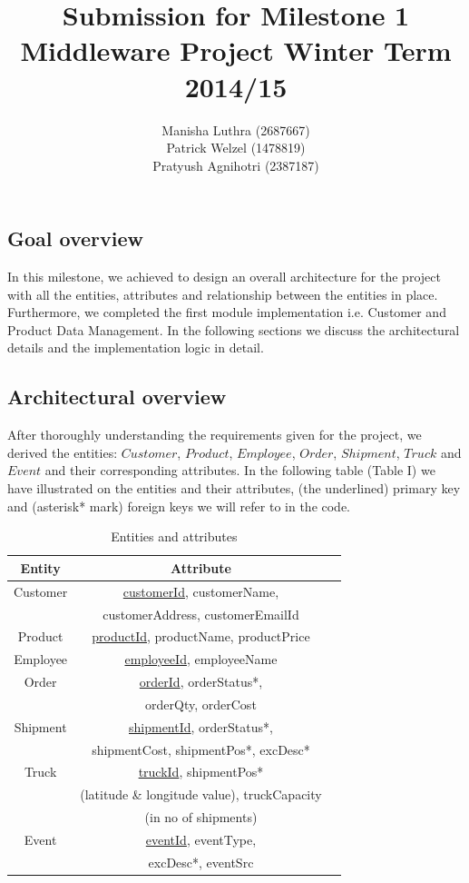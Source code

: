 \documentclass[twoside,colorbacktitle,accentcolor=tud1b]{tudexercise}
\title{Submission for Milestone 1
\linebreak[1] Middleware Project
\linebreak[1] Winter Term 2014/15}
\subtitle{Manisha Luthra (2687667) \\
Patrick Welzel (1478819)\\
Pratyush Agnihotri (2387187)}
\begin{document}
  \begin{examheader}
  \end{examheader}
\setcounter{section}{1}
\maketitle
  \subsection{Goal overview}
  In this milestone, we achieved to design an overall architecture for the project with all the entities, attributes and relationship between the entities in place. Furthermore, we completed the first module implementation i.e. Customer and Product Data Management. In the following sections we discuss the architectural details and the implementation logic in detail.
  \subsection{Architectural overview}
After thoroughly understanding the requirements given for the project, we derived the entities: $Customer$, $Product$, $Employee$, $Order$, $Shipment$, $Truck$ and $Event$ and their corresponding attributes. In the following table (Table I) we have illustrated on the entities and their attributes, (the underlined) primary key and (asterisk* mark) foreign keys we will refer to in the code.
\begin{table}[htbp]
  \centering
  \caption{Entities and attributes}
  	\begin{tabular}{|c|c|c|}
	\hline
	\textbf{Entity} & \textbf{Attribute} \\
	\hline
	Customer & \underline{customerId}, customerName,\\
	 & customerAddress, customerEmailId \\	
	\hline
	Product & \underline{productId}, productName, productPrice \\
	\hline
	Employee & \underline{employeeId}, employeeName \\
	\hline
	Order & \underline{orderId}, orderStatus*, \\
	 & orderQty, orderCost \\
	\hline
	Shipment & \underline{shipmentId}, orderStatus*, \\
	 & shipmentCost, shipmentPos*, excDesc* \\
	\hline
	Truck & \underline{truckId}, shipmentPos* \\
	 & (latitude \& longitude value), truckCapacity \\
	 & (in no of shipments) \\
	\hline
	Event & \underline{eventId}, eventType, \\
	 & excDesc*, eventSrc \\
	\hline
	\end{tabular}%
  \label{tab:addlabel}%
\end{table}%
\end{document}
